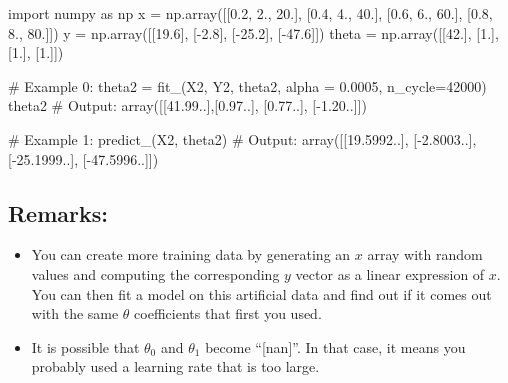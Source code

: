 \documentclass[]{article}
\newenvironment{Shaded}{\begin{snugshade}}{\end{snugshade}}
\newcommand{\CommentTok}[1]{\textcolor[rgb]{0.48,0.49,0.49}{#1}}
\newcommand{\DecValTok}[1]{\textcolor[rgb]{0.96,0.45,0.00}{#1}}
\newcommand{\FloatTok}[1]{\textcolor[rgb]{0.96,0.45,0.00}{#1}}
\newcommand{\ImportTok}[1]{\textcolor[rgb]{0.15,0.68,0.38}{#1}}
\newcommand{\NormalTok}[1]{\textcolor[rgb]{0.81,0.81,0.76}{#1}}
\newcommand{\OperatorTok}[1]{\textcolor[rgb]{0.81,0.81,0.76}{#1}}
\begin{document}
\begin{Shaded}
\begin{Highlighting}[]
\ImportTok{import}\NormalTok{ numpy }\ImportTok{as}\NormalTok{ np}
\NormalTok{x }\OperatorTok{=}\NormalTok{ np.array([[}\FloatTok{0.2}\NormalTok{, }\FloatTok{2.}\NormalTok{, }\FloatTok{20.}\NormalTok{], [}\FloatTok{0.4}\NormalTok{, }\FloatTok{4.}\NormalTok{, }\FloatTok{40.}\NormalTok{], [}\FloatTok{0.6}\NormalTok{, }\FloatTok{6.}\NormalTok{, }\FloatTok{60.}\NormalTok{], [}\FloatTok{0.8}\NormalTok{, }\FloatTok{8.}\NormalTok{, }\FloatTok{80.}\NormalTok{]])}
\NormalTok{y }\OperatorTok{=}\NormalTok{ np.array([[}\FloatTok{19.6}\NormalTok{], [}\OperatorTok{-}\FloatTok{2.8}\NormalTok{], [}\OperatorTok{-}\FloatTok{25.2}\NormalTok{], [}\OperatorTok{-}\FloatTok{47.6}\NormalTok{]])}
\NormalTok{theta }\OperatorTok{=}\NormalTok{ np.array([[}\FloatTok{42.}\NormalTok{], [}\FloatTok{1.}\NormalTok{], [}\FloatTok{1.}\NormalTok{], [}\FloatTok{1.}\NormalTok{]])}

\CommentTok{# Example 0:}
\NormalTok{theta2 }\OperatorTok{=}\NormalTok{ fit_(X2, Y2, theta2,  alpha }\OperatorTok{=} \FloatTok{0.0005}\NormalTok{, n_cycle}\OperatorTok{=}\DecValTok{42000}\NormalTok{)}
\NormalTok{theta2}
\CommentTok{# Output:}
\NormalTok{array([[}\DecValTok{41}\NormalTok{.}\DecValTok{99}\NormalTok{..],[}\DecValTok{0}\NormalTok{.}\DecValTok{97}\NormalTok{..], [}\DecValTok{0}\NormalTok{.}\DecValTok{77}\NormalTok{..], [}\OperatorTok{-}\DecValTok{1}\NormalTok{.}\DecValTok{20}\NormalTok{..]])}

\CommentTok{# Example 1:}
\NormalTok{predict_(X2, theta2)}
\CommentTok{# Output:}
\NormalTok{array([[}\DecValTok{19}\NormalTok{.}\DecValTok{5992}\NormalTok{..], [}\OperatorTok{-}\DecValTok{2}\NormalTok{.}\DecValTok{8003}\NormalTok{..], [}\OperatorTok{-}\DecValTok{25}\NormalTok{.}\DecValTok{1999}\NormalTok{..], [}\OperatorTok{-}\DecValTok{47}\NormalTok{.}\DecValTok{5996}\NormalTok{..]])}
\end{Highlighting}
\end{Shaded}

\hypertarget{remarks}{%
\subsection{Remarks:}\label{remarks}}

\begin{itemize}
\item
  You can create more training data by generating an \(x\) array with
  random values and computing the corresponding \(y\) vector as a linear
  expression of \(x\). You can then fit a model on this artificial data
  and find out if it comes out with the same \(\theta\) coefficients
  that first you used.
\item
  It is possible that \(\theta_0\) and \(\theta_1\) become
  ``{[}nan{]}''. In that case, it means you probably used a learning
  rate that is too large.
\end{itemize}
\end{document}
